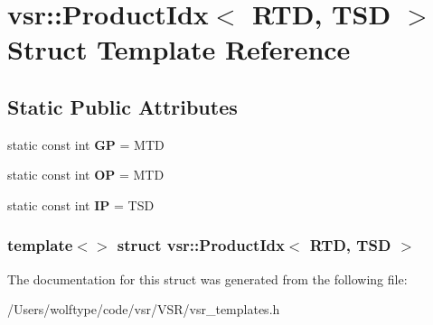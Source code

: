 \hypertarget{structvsr_1_1_product_idx_3_01_r_t_d_00_01_t_s_d_01_4}{\section{vsr\-:\-:Product\-Idx$<$ R\-T\-D, T\-S\-D $>$ Struct Template Reference}
\label{structvsr_1_1_product_idx_3_01_r_t_d_00_01_t_s_d_01_4}
}
\subsection*{Static Public Attributes}
\begin{DoxyCompactItemize}
\item 
\hypertarget{structvsr_1_1_product_idx_3_01_r_t_d_00_01_t_s_d_01_4_a276cc9512e6ea9f851c6226dd46b95e0}{static const int {\bfseries G\-P} = M\-T\-D}\label{structvsr_1_1_product_idx_3_01_r_t_d_00_01_t_s_d_01_4_a276cc9512e6ea9f851c6226dd46b95e0}

\item 
\hypertarget{structvsr_1_1_product_idx_3_01_r_t_d_00_01_t_s_d_01_4_a034192241b4d7565c2c4a9ecfda7242b}{static const int {\bfseries O\-P} = M\-T\-D}\label{structvsr_1_1_product_idx_3_01_r_t_d_00_01_t_s_d_01_4_a034192241b4d7565c2c4a9ecfda7242b}

\item 
\hypertarget{structvsr_1_1_product_idx_3_01_r_t_d_00_01_t_s_d_01_4_ae85144a117b89fd7f7901971b8af6cd6}{static const int {\bfseries I\-P} = T\-S\-D}\label{structvsr_1_1_product_idx_3_01_r_t_d_00_01_t_s_d_01_4_ae85144a117b89fd7f7901971b8af6cd6}

\end{DoxyCompactItemize}
\subsubsection*{template$<$$>$ struct vsr\-::\-Product\-Idx$<$ R\-T\-D, T\-S\-D $>$}



The documentation for this struct was generated from the following file\-:\begin{DoxyCompactItemize}
\item 
/\-Users/wolftype/code/vsr/\-V\-S\-R/vsr\-\_\-templates.\-h\end{DoxyCompactItemize}
